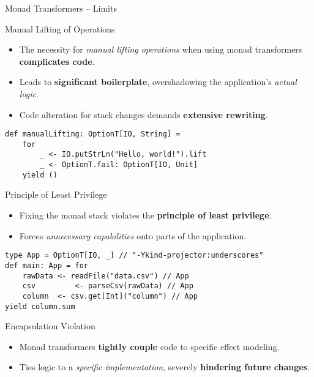 \documentclass[presentation, 10pt]{beamer}\mode<presentation>{\usetheme{metropolis}}
\begin{document}
\begin{frame}[fragile,shrink=35]{Monad Transformers -- Limits}
\begin{exampleblock}{Manual Lifting of Operations}
	\begin{itemize}
		\item The necessity for \emph{manual lifting operations} when using monad transformers \textbf{complicates code}.
  \item Leads to \textbf{significant boilerplate}, overshadowing the application's \emph{actual logic}.
  \item Code alteration for stack changes demands \textbf{extensive rewriting}.
	\end{itemize}
\begin{tcolorbox}
\begin{verbatim}
def manualLifting: OptionT[IO, String] =
	for
		_ <- IO.putStrLn("Hello, world!").lift
		_ <- OptionT.fail: OptionT[IO, Unit]
	yield ()
\end{verbatim}
\end{tcolorbox}
\end{exampleblock}
\begin{exampleblock}{Principle of Least Privilege}
	\begin{itemize}
		\item Fixing the monad stack violates the \textbf{principle of least privilege}.
		\item Forces \emph{unnecessary capabilities} onto parts of the application.
	\end{itemize}
\begin{tcolorbox}
\begin{verbatim}
type App = OptionT[IO, _] // "-Ykind-projector:underscores"
def main: App = for
	rawData <- readFile("data.csv") // App
	csv 		<- parseCsv(rawData) // App
	column  <- csv.get[Int]("column") // App
yield column.sum
\end{verbatim}
\end{tcolorbox}
\end{exampleblock}
\begin{exampleblock}{Encapsulation Violation}
\begin{itemize}
	\item Monad transformers \textbf{tightly couple} code to specific effect modeling.
	\item Ties logic to a \emph{specific implementation}, severely \textbf{hindering future changes}.
\end{itemize}
\end{exampleblock}
\end{frame}
\end{document}
